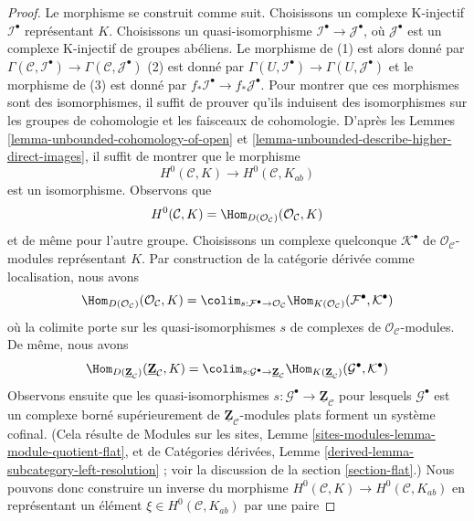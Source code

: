 \begin{proof}
Le morphisme se construit comme suit. Choisissons un complexe K-injectif
$\mathcal{I}^\bullet$ représentant $K$. Choisissons un quasi-isomorphisme
$\mathcal{I}^\bullet \to \mathcal{J}^\bullet$, où $\mathcal{J}^\bullet$
est un complexe K-injectif de groupes abéliens. Le morphisme de (1) est
alors donné par
$\Gamma(\mathcal{C}, \mathcal{I}^\bullet) \to
\Gamma(\mathcal{C}, \mathcal{J}^\bullet)$
(2) est donné par
$\Gamma(U, \mathcal{I}^\bullet) \to \Gamma(U, \mathcal{J}^\bullet)$
et le morphisme de (3) est donné par
$f_*\mathcal{I}^\bullet \to f_*\mathcal{J}^\bullet$.
Pour montrer que ces morphismes sont des isomorphismes, il suffit de
prouver qu'ils induisent des isomorphismes sur les groupes de cohomologie
et les faisceaux de cohomologie. D'après les Lemmes
\ref{lemma-unbounded-cohomology-of-open} et
\ref{lemma-unbounded-describe-higher-direct-images}, il suffit de montrer
que le morphisme
$$
H^0(\mathcal{C}, K) \longrightarrow H^0(\mathcal{C}, K_{ab})
$$
est un isomorphisme. Observons que
$$
H^0(\mathcal{C}, K) =
\Hom_{D(\mathcal{O}_\mathcal{C})}(\mathcal{O}_\mathcal{C}, K)
$$
et de même pour l'autre groupe. Choisissons un complexe quelconque
$\mathcal{K}^\bullet$ de $\mathcal{O}_\mathcal{C}$-modules représentant
$K$. Par construction de la catégorie dérivée comme localisation, nous
avons
$$
\Hom_{D(\mathcal{O}_\mathcal{C})}(\mathcal{O}_\mathcal{C}, K) =
\colim_{s : \mathcal{F}^\bullet \to \mathcal{O}_\mathcal{C}}
\Hom_{K(\mathcal{O}_\mathcal{C})}(\mathcal{F}^\bullet, \mathcal{K}^\bullet)
$$
où la colimite porte sur les quasi-isomorphismes $s$ de complexes de
$\mathcal{O}_\mathcal{C}$-modules. De même, nous avons
$$
\Hom_{D(\underline{\mathbf{Z}}_\mathcal{C})}
(\underline{\mathbf{Z}}_\mathcal{C}, K) =
\colim_{s : \mathcal{G}^\bullet \to \underline{\mathbf{Z}}_\mathcal{C}}
\Hom_{K(\underline{\mathbf{Z}}_\mathcal{C})}
(\mathcal{G}^\bullet, \mathcal{K}^\bullet)
$$
Observons ensuite que les quasi-isomorphismes
$s : \mathcal{G}^\bullet \to \underline{\mathbf{Z}}_\mathcal{C}$
pour lesquels $\mathcal{G}^\bullet$ est un complexe borné supérieurement
de $\underline{\mathbf{Z}}_\mathcal{C}$-modules plats forment un système
cofinal. (Cela résulte de Modules sur les sites, Lemme
\ref{sites-modules-lemma-module-quotient-flat}, et de Catégories dérivées,
Lemme \ref{derived-lemma-subcategory-left-resolution} ; voir la discussion
de la section \ref{section-flat}.) Nous pouvons donc construire un inverse
du morphisme
$H^0(\mathcal{C}, K) \longrightarrow H^0(\mathcal{C}, K_{ab})$
en représentant un élément $\xi \in H^0(\mathcal{C}, K_{ab})$ par une paire

\end{proof}
